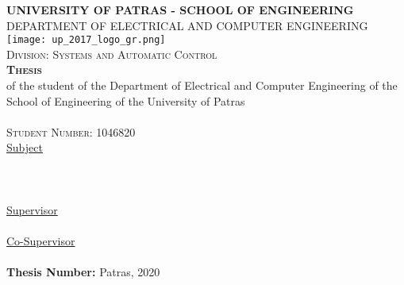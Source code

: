 \pagestyle{empty}

\begin{titlepage}
\begin{center}
\textsc{\textbf{\large UNIVERSITY OF PATRAS - SCHOOL OF ENGINEERING}\\
\large DEPARTMENT OF ELECTRICAL AND COMPUTER ENGINEERING}\\

\texttt{[image: up\_2017\_logo\_gr.png]}\\  

\textsc{Division: \large Systems and Automatic Control}\\[1cm]

\textsc{\textbf{\LARGE{Thesis}}}\\ [0.5cm]
of the student of the Department of Electrical and Computer Engineering of the School of Engineering of the University of Patras\\[0.5cm]

\textsc{\Large \me }\\[0.5cm]
\textsc{\large Student Number: 1046820}\\[1cm]

\underline{\large Subject}\\
\HRule \\[0.4cm]
{\huge \bfseries \thesistitle }\\[0.4cm] %
\HRule \\[1.5cm]

\underline{\large Supervisor}\\[0.5cm]
\large \suptitle \, \supname \\[1cm]
\underline{\large Co-Supervisor}\\[0.5cm]
\large \cosuptitle \, \cosupname \\[1cm]
\textbf{Thesis Number:}
\vfill
\large{Patras, 2020}
\end{center}
\end{titlepage}
